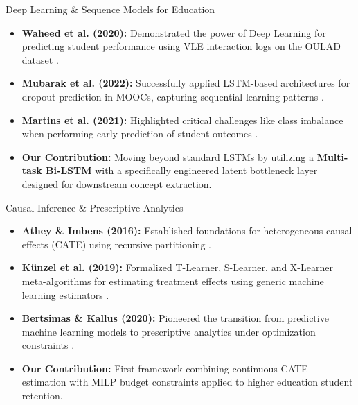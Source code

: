 \documentclass[aspectratio=169, 10pt]{beamer}
\begin{document}
\begin{frame}{Deep Learning \& Sequence Models for Education}
  \begin{itemize}
    \item \textbf{Waheed et al. (2020):} Demonstrated the power of Deep Learning for predicting student performance using VLE interaction logs on the OULAD dataset \cite{waheed2020predicting}.
    \vspace{0.2cm}
    \item \textbf{Mubarak et al. (2022):} Successfully applied LSTM-based architectures for dropout prediction in MOOCs, capturing sequential learning patterns \cite{mubarak2022deep}.
    \vspace{0.2cm}
    \item \textbf{Martins et al. (2021):} Highlighted critical challenges like class imbalance when performing early prediction of student outcomes \cite{martins2021early}.
    \vspace{0.2cm}
    \item \textbf{Our Contribution:} Moving beyond standard LSTMs by utilizing a \textbf{Multi-task Bi-LSTM} with a specifically engineered latent bottleneck layer designed for downstream concept extraction.
  \end{itemize}
\end{frame}

\begin{frame}{Causal Inference \& Prescriptive Analytics}
  \begin{itemize}
    \item \textbf{Athey \& Imbens (2016):} Established foundations for heterogeneous causal effects (CATE) using recursive partitioning \cite{athey2016recursive}.
    \vspace{0.2cm}
    \item \textbf{K\"unzel et al. (2019):} Formalized T-Learner, S-Learner, and X-Learner meta-algorithms for estimating treatment effects using generic machine learning estimators \cite{kunzel2019metalearners}.
    \vspace{0.2cm}
    \item \textbf{Bertsimas \& Kallus (2020):} Pioneered the transition from predictive machine learning models to prescriptive analytics under optimization constraints \cite{bertsimas2020predictive}.
    \vspace{0.2cm}
    \item \textbf{Our Contribution:} First framework combining continuous CATE estimation with MILP budget constraints applied to higher education student retention.
  \end{itemize}
\end{frame}
\end{document}
